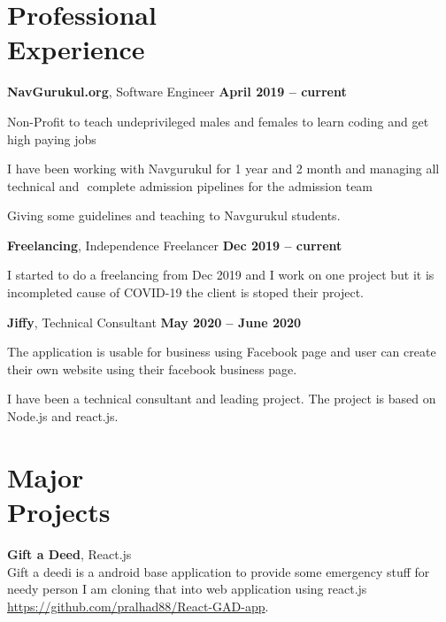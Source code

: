 \documentclass[margin,line]{resume}
\begin{document}
\begin{resume}
    \section{\mysidestyle Professional\\Experience}
    \textbf{NavGurukul.org}, Software Engineer \hfill \textbf{April 2019 -- current}
    \begin{list2}
        \item Non-Profit to teach undeprivileged males and females to learn coding and get high paying jobs
        \item I have been working with Navgurukul for 1 year and 2 month and managing all technical and ​ complete admission pipelines for the admission team
        \item Giving some guidelines and teaching to Navgurukul students.
    \end{list2}\vspace{-1.5mm}

    \textbf{Freelancing}, Independence Freelancer \hfill \textbf{Dec 2019 -- current}
    \begin{list2}
        \item I started to do a freelancing from Dec 2019 and I work on one project but it is incompleted cause of COVID-19 the client is stoped their project.
    \end{list2}\vspace{-1.5mm}

    \textbf{Jiffy}, Technical Consultant \hfill \textbf{May 2020 -- June 2020}
    \begin{list2}
        \item The application is usable for business using Facebook page and user can create their own website using their facebook business page.
        \item I have been a technical consultant and leading project. The project is based on Node.js and react.js.
    \end{list2}\vspace{-1.5mm}

    \section{\mysidestyle Major\\Projects}
    \textbf{Gift a Deed}, React.js
    \\ Gift a deedi is a android base application to provide some emergency stuff for needy person I am cloning that into web application using react.js \url{https://github.com/pralhad88/React-GAD-app}.
    

\end{resume}
\end{document}
